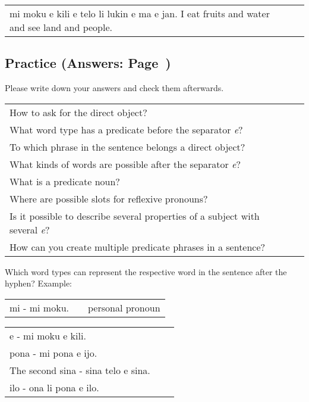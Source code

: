 \begin{supertabular}{p{5,5cm}|ll}
    mi moku e kili e telo li lukin e ma e jan. I eat fruits and water and see land and people. \\
\end{supertabular}

\newpage

\subsection*{Practice (Answers: Page~\pageref{'direct_objects_compund_sentences'})}

Please write down your answers and check them afterwards.

\begin{supertabular}{p{5,5cm}|ll}
    How to ask for the direct object?                                                   &  & \\
    What word type has a predicate before the separator \textit{e}?                     &  & \\
    To which phrase in the sentence belongs a direct object?                            &  & \\
    What kinds of words are possible after the separator \textit{e}?                    &  & \\
    What is a predicate noun?                                                           &  & \\
    Where are possible slots for reflexive pronouns?                                    &  & \\
    Is it possible to describe several properties of a subject with several \textit{e}? &  & \\
    How can you create multiple predicate phrases in a sentence?                        &  & \\
\end{supertabular}

Which word types can represent the respective word in the sentence after the hyphen?
Example:

\begin{supertabular}{p{5,5cm}|ll}
    mi - mi moku. &  & personal pronoun \\
\end{supertabular}

\begin{supertabular}{p{5,5cm}|ll}
    e - mi moku e kili.                 &  & \\
    pona - mi pona e ijo.               &  & \\
    The second sina - sina telo e sina. &  & \\
    ilo - ona li pona e ilo.            &  & \\
\end{supertabular}

